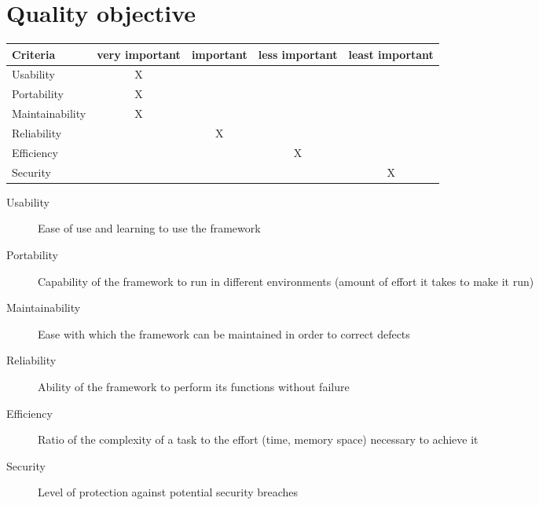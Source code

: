 \section{Quality objective}

\begin{tabular}{lcccc}
\hline
\textbf{Criteria} & \textbf{very important} & \textbf{important} & \textbf{less important} & \textbf{least important} \\
\hline
Usability & X & & & \\
Portability & X & & & \\
Maintainability & X & & & \\
Reliability & & X & & \\
Efficiency & & & X & \\
Security & & & & X \\
\hline

\end{tabular}


\begin{description}
	\item[Usability] Ease of use and learning to use the framework
	\item[Portability] Capability of the framework to run in different environments (amount of effort it takes to make it run)
	\item[Maintainability] Ease with which the framework can be maintained in order to correct defects
	\item[Reliability] Ability of the framework to perform its functions without failure
	\item[Efficiency] Ratio of the complexity of a task to the effort (time, memory space) necessary to achieve it
	\item[Security] Level of protection against potential security breaches
\end{description}